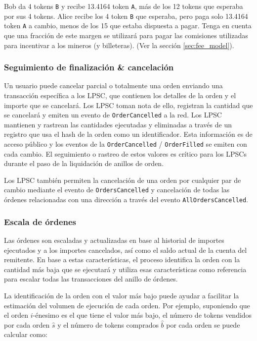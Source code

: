 \documentclass[UTF8,nofonts]{article}
\begin{document}
\begin{multicols}{2}
Bob da 4 tokens \verb|B| y recibe 13.4164 token \verb|A|, m\'as de los 12 tokens que esperaba por sus 4 tokens. Alice recibe los 4 token \verb|B| que esperaba, pero paga solo 13.4164 token \verb|A| a cambio, menos de los 15 que estaba dispuesta a pagar. Tenga en cuenta que una fracci\'on de este margen se utilizar\'a para pagar las comisiones utilizadas para incentivar a los mineros (y billeteras). (Ver la secci\'on \ref{sec:fee_model}).


\subsubsection{Seguimiento de finalizaci\'on \& cancelaci\'on}

Un usuario puede cancelar parcial o totalmente una orden enviando una transacci\'on espec\'ifica a los LPSC, que contienen los detalles de la orden y el importe que se cancelar\'a. Los LPSC toman nota de ello, registran la cantidad que se cancelar\'a y emiten un evento de \verb|OrderCancelled| a la red. Los LPSC mantienen y rastrean las cantidades ejecutadas y eliminadas a trav\'es de un registro que usa el hash de la orden como un identificador. Esta informaci\'on es de acceso p\'ublico y los eventos de la \verb|OrderCancelled| / \verb|OrderFilled| se emiten con cada cambio. El seguimiento o rastreo de estos valores es cr\'itico para los LPSCs durante el paso de la liquidaci\'on de anillos de orden. 

Los LPSC tambi\'en permiten la cancelaci\'on de una orden por cualquier par de cambio mediante el evento de \verb|OrdersCancelled| y cancelaci\'on de todas las \'ordenes relacionadas con una direcci\'on a trav\'es del evento \verb|AllOrdersCancelled|.


\subsubsection{Escala de \'ordenes\label{sec:order_scaling}}
Las \'ordenes son escaladas y actualizadas en base al historial de importes ejecutados y a los importes cancelados, as\'i como el saldo actual de la cuenta del remitente. En base a estas caracter\'isticas, el proceso identifica la orden con la cantidad m\'as baja que se ejecutar\'a y utiliza esas caracter\'isticas como referencia para escalar todas las transacciones del anillo de \'ordenes.

La identificaci\'on de la orden con el valor m\'as bajo puede ayudar a facilitar la estimaci\'on del volumen de ejecuci\'on de cada orden. Por ejemplo, suponiendo que el orden $i$-\'enesimo es el que tiene el valor m\'as bajo, el n\'umero de tokens vendidos por cada orden $\hat{s}$ y el n\'umero de tokens comprados $\hat{b}$ por cada orden se puede calcular como:


\end{multicols}
\end{document}
